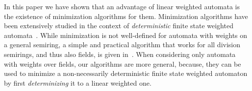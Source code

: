 \documentclass[3p]{elsarticle}
\begin{document}
In this paper we have shown that an advantage of linear weighted automata is the
existence of minimization algorithms for them. Minimization algorithms have been
extensively studied in the context of \emph{deterministic} finite state weighted
automata~\cite{Moh97,Moh00,Moh09}. While minimization is not well-defined for
automata with weights on a general semiring, a simple and practical algorithm
that works for all division semirings, and thus also fields, is given in~\cite{Eis03}.
When considering  only automata with weights over fields, our algorithms are more
general, because, they can be used to minimize a non-necessarily deterministic finite
state weighted automaton by first \emph{determinizing} it to a linear weighted one.





\end{document}
